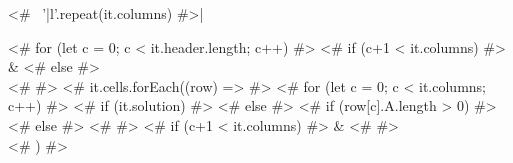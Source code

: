 \begin{center}
\begin{tabular}{<#~ '|l'.repeat(it.columns) #>|}

\hline
<# for (let c = 0; c < it.header.length; c++) { #>
<# if (c+1 < it.columns) { #>
&
<# } else { #>
\\
\hline
<# }} #>
<# it.cells.forEach((row) => { #>
<# for (let c = 0; c < it.columns; c++) { #>
%
<# if (it.solution) { #>
<# } else { #>
<# if (row[c].A.length > 0) { #>
<# } else { #>
\hspace{<#~ it.cellWidth #>}
<# }} #>
<# if (c+1 < it.columns) { #>
&
<# }} #>
\\
\hline
<# }) #>

\end{tabular}
\end{center}
